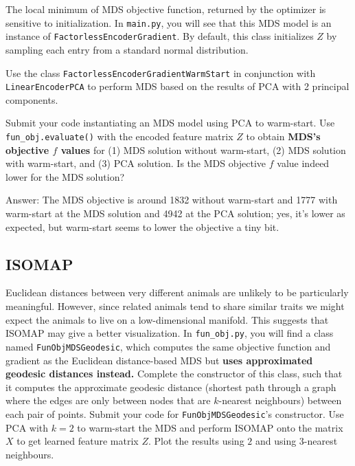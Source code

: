 \documentclass{article}
\def\ans#1{\par\gre{Answer: #1}}
\def\answer#1{\ans{#1}}
\def\blu#1{{\color{blu}#1}}
\def\gre#1{{\color{gre}#1}}
\begin{document}
The local minimum of MDS objective function, returned by the optimizer is sensitive to initialization. In \texttt{main.py}, you will see that this MDS model is an instance of \texttt{FactorlessEncoderGradient}. By default, this class initializes $Z$ by sampling each entry from a standard normal distribution.

Use the class \texttt{FactorlessEncoderGradientWarmStart} in conjunction with \texttt{LinearEncoderPCA} to perform MDS based on the results of PCA with 2 principal components.

\blu{Submit your code instantiating an MDS model using PCA to warm-start. Use \texttt{fun\_obj.evaluate()} with the encoded feature matrix $Z$ to obtain \textbf{MDS's objective $f$ values} for (1) MDS solution without warm-start, (2) MDS solution with warm-start, and (3) PCA solution. Is the MDS objective $f$ value indeed lower for the MDS solution?} 

\answer{The MDS objective is around 1832 without warm-start and 1777 with warm-start at the MDS solution and 4942 at the PCA solution; yes, it's lower as expected, but warm-start seems to lower the objective a tiny bit.} %


\subsection{ISOMAP}

Euclidean distances between very different animals are unlikely to be particularly meaningful.
However, since related animals tend to share similar traits we might expect the animals to live on a low-dimensional manifold.
This suggests that ISOMAP may give a better visualization.
In \texttt{fun\_obj.py}, you will find a class named \texttt{FunObjMDSGeodesic}, which computes the same objective function and gradient as the Euclidean distance-based MDS but \textbf{uses approximated geodesic distances instead.} Complete the constructor of this class, such that it computes the approximate geodesic distance
(shortest path through a graph where the edges are only between nodes that are $k$-nearest neighbours) between each pair of points. \blu{Submit your code for \texttt{FunObjMDSGeodesic}'s constructor. Use PCA with $k=2$ to warm-start the MDS and perform ISOMAP onto the matrix $X$ to get learned feature matrix $Z$. Plot the results using $2$ and using $3$-nearest neighbours}.
\end{document}

